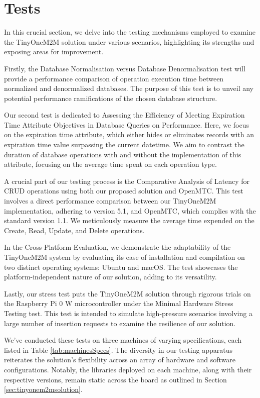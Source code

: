 \documentclass[a4paper,fleqn]{cas-dc}
\begin{document}
\section{Tests}
\label{tests}

In this crucial section, we delve into the testing mechanisms employed to examine the TinyOneM2M solution under various scenarios, highlighting its strengths and exposing areas for improvement.

Firstly, the Database Normalisation versus Database Denormalisation test will provide a performance comparison of operation execution time between normalized and denormalized databases. The purpose of this test is to unveil any potential performance ramifications of the chosen database structure.

Our second test is dedicated to Assessing the Efficiency of Meeting Expiration Time Attribute Objectives in Database Queries on Performance. Here, we focus on the expiration time attribute, which either hides or eliminates records with an expiration time value surpassing the current datetime. We aim to contrast the duration of database operations with and without the implementation of this attribute, focusing on the average time spent on each operation type.

A crucial part of our testing process is the Comparative Analysis of Latency for CRUD operations using both our proposed solution and OpenMTC. This test involves a direct performance comparison between our TinyOneM2M implementation, adhering to version 5.1, and OpenMTC, which complies with the standard version 1.1. We meticulously measure the average time expended on the Create, Read, Update, and Delete operations.

In the Cross-Platform Evaluation, we demonstrate the adaptability of the TinyOneM2M system by evaluating its ease of installation and compilation on two distinct operating systems: Ubuntu and macOS. The test showcases the platform-independent nature of our solution, adding to its versatility.

Lastly, our stress test puts the TinyOneM2M solution through rigorous trials on the Raspberry Pi 0 W microcontroller under the Minimal Hardware Stress Testing test. This test is intended to simulate high-pressure scenarios involving a large number of insertion requests to examine the resilience of our solution.

We've conducted these tests on three machines of varying specifications, each listed in Table \ref{tab:machinesSpecs}. The diversity in our testing apparatus reiterates the solution's flexibility across an array of hardware and software configurations. Notably, the libraries deployed on each machine, along with their respective versions, remain static across the board as outlined in Section \ref{sec:tinyonem2msolution}.
\end{document}
